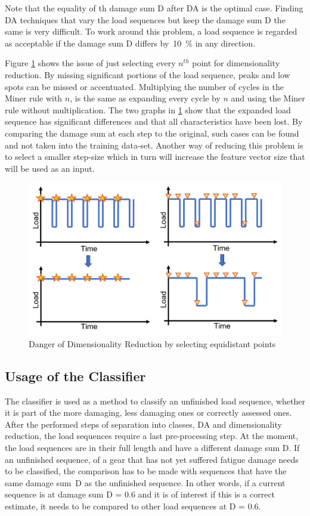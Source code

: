 Note that the equality of th damage sum D after DA is the optimal case. Finding DA techniques that vary the load sequences but keep the damage sum D the same is very difficult. To work around this problem, a load sequence is regarded as acceptable if the damage sum D differs by~10~\% in any direction.


Figure \ref{fig:UL} shows the issue of just selecting every \(n^{th}\) point for dimensionality reduction. By missing significant portions of the load sequence, peaks and low spots can be missed or accentuated. Multiplying the number of cycles in the Miner rule with \(n\), is the same as expanding every cycle by \(n\) and using the Miner rule without multiplication. The two graphs in \ref{fig:UL} show that the expanded load sequence has significant differences and that all characteristics have been lost. By comparing the damage sum at each step to the original, such cases can be found and not taken into the training data-set. Another way of reducing this problem is to select a smaller step-size which in turn will increase the feature vector size that will be used as an input. 

\begin{figure}[H]
	\centering
	\includegraphics[width=0.8\linewidth]{IMGs/Unlucky.png}
	\caption{Danger of Dimensionality Reduction by selecting equidistant points}
	\label{fig:UL}
\end{figure}
 
\subsection{Usage of the Classifier}
The classifier is used as a method to classify an unfinished load sequence, whether it is part of the more damaging, less damaging ones or correctly assessed ones. After the performed steps of separation into classes, DA and dimensionality reduction, the load sequences require a last pre-processing step. At the moment, the load sequences are in their full length and have a different damage sum D.
If an unfinished sequence, of a gear that has not yet suffered fatigue damage needs to be classified, the comparison has to be made with sequences that have the same damage sum~D as the unfinished sequence. In other words, if a current sequence is at damage sum D = 0.6 and it is of interest if this is a correct estimate, it needs to be compared to other load sequences at D = 0.6.
 
